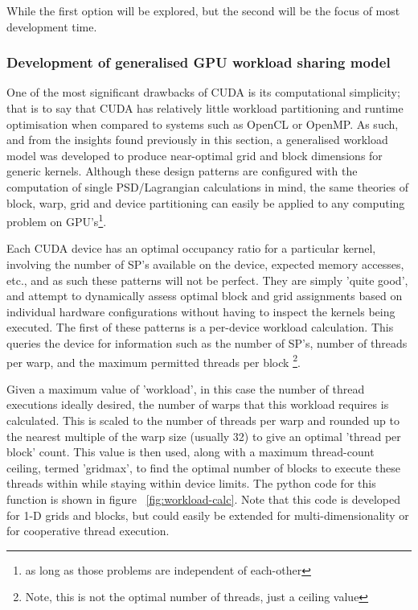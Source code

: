 While the first option will be explored, but the second will be the focus of most development time.

\subsubsection{Development of generalised GPU workload sharing model}
One of the most significant drawbacks of CUDA is its computational simplicity; that is to say that CUDA has relatively little workload partitioning and runtime optimisation when compared to systems such as OpenCL or OpenMP. As such, and from the insights found previously in this section, a generalised workload model was developed to produce near-optimal grid and block dimensions for generic kernels. Although these design patterns are configured with the computation of single PSD/Lagrangian calculations in mind, the same theories of block, warp, grid and device partitioning can easily be applied to any computing problem on GPU's\footnote{as long as those problems are independent of each-other}.

Each CUDA device has an optimal occupancy ratio for a particular kernel, involving the number of SP's available on the device, expected memory accesses, etc., and as such these patterns will not be perfect. They are simply 'quite good', and attempt to dynamically assess optimal block and grid assignments based on individual hardware configurations without having to inspect the kernels being executed. The first of these patterns is a per-device workload calculation. This queries the device for information such as the number of SP's, number of threads per warp, and the maximum permitted threads per block \footnote{Note, this is not the optimal number of threads, just a ceiling value}.

Given a maximum value of 'workload', in this case the number of thread executions ideally desired, the number of warps that this workload requires is calculated. This is scaled to the number of threads per warp and rounded up to the nearest multiple of the warp size (usually 32) to give an optimal 'thread per block' count. This value is then used, along with a maximum thread-count ceiling, termed 'gridmax', to find the optimal number of blocks to execute these threads within while staying within device limits. The python code for this function is shown in figure ~\ref{fig:workload-calc}. Note that this code is developed for 1-D grids and blocks, but could easily be extended for multi-dimensionality or for cooperative thread execution.

